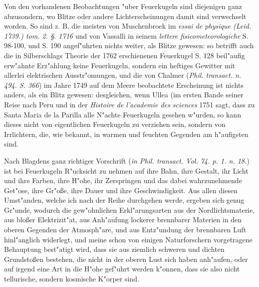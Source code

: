 \documentclass[a4paper, 11pt, oneside, polutonikogreek, german]{article}
\begin{document}
Von den vorhandenen Beobachtungen "uber Feuerkugeln sind diejenigen ganz abzusondern, wo Blitze oder andere Lichterscheinungen damit sind verwechselt worden. So sind z. B. die meisten von Muschenbroek im \emph{essai de physique (Leid. 1739.) tom. 2. §. 1716} und von Vassalli in seinem \emph{lettere fisicometeorologiche} S. 98-100, und S. 190 angef"uhrten nichts weiter, als Blitze gewesen: so betrifft auch die in Silberschlags Theorie der 1762 erschienenen Feuerkugel S. 128 beil"aufig erw"ahnte Erz"ahlung keine Feuerkugeln, sondern ein heftiges Gewitter mit allerlei elektrischen Ausstr"omungen, und die von Chalmer (\emph{Phil. transact. n. 494. S. 366}) im Jahre 1749 auf dem Meere beobachtete Erscheinung ist nichts anders, als ein Blitz gewesen: desgleichen, wenn Ullea (im ersten Bande seiner Reise nach Peru und in der \emph{Histoire de l'academie des sciences} 1751 sagt, dass zu Santa Maria de la Parilla alle N"achte Feuerkugeln gesehen w"urden, so kann dieses nicht von eigentlichen Feuerkugeln zu verziehen sein, sondern von Irrlichtern, die, wie bekannt, in warmen und feuchten Gegenden am h"aufigsten sind.

Nach Blagdens ganz richtiger Vorschrift (\emph{in Phil. transact. Vol. 74. p. 1. n. 18.}) ist bei Feuerkugeln R"ucksicht zu nehmen auf ihre Bahn, ihre Gestalt, ihr Licht und ihre Farben, ihre H"ohe, ihr Zerspringen und das dabei wahrzunehmende Get"ose, ihre Gr"oße, ihre Dauer und ihre Geschwindigkeit. Aus allen diesen Umst"anden, welche ich nach der Reihe durchgehen werde, ergeben sich genug Gr"unde, wodurch die gew"ohnlichen Erkl"arungsarten aus der Nordlichtsmaterie, aus bloßer Elektrizit"at, aus Anh"aufung lockerer brennbarer Materien in den oberen Gegenden der Atmosph"are, und aus Entz"undung der brennbaren Luft hinl"anglich widerlegt, und meine schon von einigen Naturforschern vorgetragene Behauptung best"atigt wird, dass sie aus ziemlich schweren und dichten Grundstoßen bestehen, die nicht in der oberen Lust sich haben anh"aufen, oder auf irgend eine Art in die H"ohe gef"uhrt werden k"onnen, dass sie also nicht tellurische, sondern kosmische K"orper sind.
\end{document}
